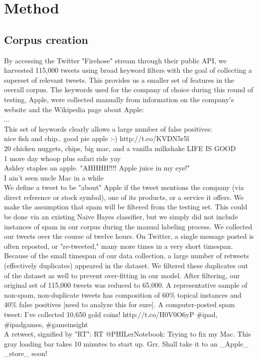\documentclass[letterpaper]{article}
\begin{document}
\section{Method}
\subsection{Corpus creation}
By accessing the Twitter "Firehose" stream through their public API, we harvested 115,000 tweets using broad keyword filters with the goal of collecting a superset of relevant tweets. This provides us a smaller set of features in the overall corpus. The keywords used for the company of choice during this round of testing, Apple, were collected manually from information on the company's website and the Wikipedia page about Apple:\\
...\\

This set of keywords clearly allows a large number of false positives:\\
nice fish and chip.. good pie apple :-) http://t.co/KVDN5r5l \\
20 chicken nuggets, chips, big mac, and a vanilla milkshake LIFE IS GOOD \\
1 more day whoop plus safari ride yay \\
Ashley staples an apple.  "AHHHH!!!!  Apple juice in my eye!" \\
I ain't seen uncle Mac in a while\\

We define a tweet to be "about" Apple if the tweet mentions the company (via direct reference or stock symbol), one of its products, or a service it offers. We make the assumption that spam will be filtered from the testing set. This could be done via an existing Naive Bayes classifier, but we simply did not include instances of spam in our corpus during the manual labeling process. We collected our tweets over the course of twelve hours. On Twitter, a single message posted is often reposted, or "re-tweeted," many more times in a very short timespan. Because of the small timespan of our data collection, a large number of retweets (effectively duplicates) appeared in the dataset. We filtered these duplicates out of the dataset as well to prevent over-fitting in our model. After filtering, our original set of 115,000 tweets was reduced to 65,000. A representative sample of non-spam, non-duplicate tweets has composition of 60\% topical instances and 40\% false positives [need to analyze this for sure].
A computer-posted spam tweet: I've collected 10,650 gold coins! http://t.co/H0V0O6yP \#ipad, \#ipadgames, \#gameinsight\\
A retweet, signified by "RT": RT @PHILerNotebook: Trying to fix my Mac. This gray loading bar takes 10 minutes to start up. Grr. Shall take it to an \_Apple\_ \_store\_ soon! \\
\end{document}
